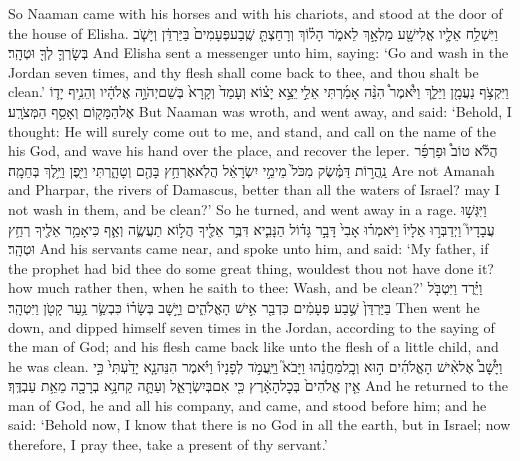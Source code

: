 {So Naaman came with his horses and with his chariots, and stood at the door of the house of Elisha.}
{וַיִּשְׁלַ֥ח אֵלָ֛יו אֱלִישָׁ֖ע מַלְאָ֣ךְ לֵאמֹ֑ר הָל֗וֹךְ וְרָחַצְתָּ֤ שֶֽׁבַע\maqqaf פְּעָמִים֙ בַּיַּרְדֵּ֔ן וְיָשֹׁ֧ב בְּשָׂרְךָ֛ לְךָ֖ וּטְהָֽר׃}
{And Elisha sent a messenger unto him, saying: ‘Go and wash in the Jordan seven times, and thy flesh shall come back to thee, and thou shalt be clean.’}
{וַיִּקְצֹ֥ף נַעֲמָ֖ן וַיֵּלַ֑ךְ וַיֹּ֩אמֶר֩ הִנֵּ֨ה אָמַ֜רְתִּי אֵלַ֣י \legarmeh  יֵצֵ֣א יָצ֗וֹא וְעָמַד֙ וְקָרָא֙ בְּשֵׁם\maqqaf יְהֹוָ֣ה אֱלֹהָ֔יו וְהֵנִ֥יף יָד֛וֹ אֶל\maqqaf הַמָּק֖וֹם וְאָסַ֥ף הַמְּצֹרָֽע׃}
{But Naaman was wroth, and went away, and said: ‘Behold, I thought: He will surely come out to me, and stand, and call on the name of the \lord\space his God, and wave his hand over the place, and recover the leper.}
{הֲלֹ֡א טוֹב֩  וּפַרְפַּ֜ר נַֽהֲר֣וֹת דַּמֶּ֗שֶׂק מִכֹּל֙ מֵימֵ֣י יִשְׂרָאֵ֔ל הֲלֹֽא\maqqaf אֶרְחַ֥ץ בָּהֶ֖ם וְטָהָ֑רְתִּי וַיִּ֖פֶן וַיֵּ֥לֶךְ בְּחֵמָֽה׃}
{Are not Amanah and Pharpar, the rivers of Damascus, better than all the waters of Israel? may I not wash in them, and be clean?’ So he turned, and went away in a rage.}
{וַיִּגְּשׁ֣וּ עֲבָדָיו֮ וַיְדַבְּר֣וּ אֵלָיו֒ וַיֹּאמְר֗וּ אָבִי֙ דָּבָ֣ר גָּד֗וֹל הַנָּבִ֛יא דִּבֶּ֥ר אֵלֶ֖יךָ הֲל֣וֹא תַעֲשֶׂ֑ה וְאַ֛ף כִּי\maqqaf אָמַ֥ר אֵלֶ֖יךָ רְחַ֥ץ וּטְהָֽר׃}
{And his servants came near, and spoke unto him, and said: ‘My father, if the prophet had bid thee do some great thing, wouldest thou not have done it? how much rather then, when he saith to thee: Wash, and be clean?’}
{וַיֵּ֗רֶד וַיִּטְבֹּ֤ל בַּיַּרְדֵּן֙ שֶׁ֣בַע פְּעָמִ֔ים כִּדְבַ֖ר אִ֣ישׁ הָאֱלֹהִ֑ים וַיָּ֣שׇׁב בְּשָׂר֗וֹ כִּבְשַׂ֛ר נַ֥עַר קָטֹ֖ן וַיִּטְהָֽר׃}
{Then went he down, and dipped himself seven times in the Jordan, according to the saying of the man of God; and his flesh came back like unto the flesh of a little child, and he was clean.}
{וַיָּ֩שׇׁב֩ אֶל\maqqaf אִ֨ישׁ הָאֱלֹהִ֜ים ה֣וּא וְכׇֽל\maqqaf מַחֲנֵ֗הוּ וַיָּבֹא֮ וַיַּֽעֲמֹ֣ד לְפָנָיו֒ וַיֹּ֗אמֶר הִנֵּה\maqqaf נָ֤א יָדַ֙עְתִּי֙ כִּ֣י אֵ֤ין אֱלֹהִים֙ בְּכׇל\maqqaf הָאָ֔רֶץ כִּ֖י אִם\maqqaf בְּיִשְׂרָאֵ֑ל וְעַתָּ֛ה קַח\maqqaf נָ֥א בְרָכָ֖ה מֵאֵ֥ת עַבְדֶּֽךָ׃}
{And he returned to the man of God, he and all his company, and came, and stood before him; and he said: ‘Behold now, I know that there is no God in all the earth, but in Israel; now therefore, I pray thee, take a present of thy servant.’}
